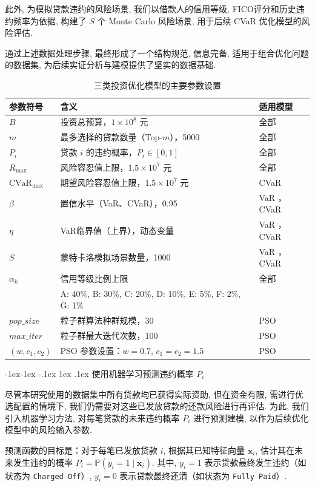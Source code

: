 \documentclass{write_paper}
\makeatletter
\renewcommand\subsection{\@startsection{subsection}{2}{\z@}%
                                     {-1ex\@plus -1ex \@minus -.1ex}%
                                     {1ex \@plus .1ex}%
                                     {\normalfont \normalsize \bfseries}}
\makeatother
\begin{document}
此外, 为模拟贷款违约的风险场景, 我们以借款人的信用等级, FICO评分和历史违约频率为依据, 构建了 $S$ 个 Monte Carlo 风险场景, 用于后续 CVaR 优化模型的风险评估. 

通过上述数据处理步骤, 最终形成了一个结构规范, 信息完备, 适用于组合优化问题的数据集, 为后续实证分析与建模提供了坚实的数据基础. 

\begin{table}[htbp]
\centering
\caption{三类投资优化模型的主要参数设置}
\begin{tabular}{lll}
\toprule
 {参数符号} &{含义} &{适用模型} \\
\midrule
$B$ & 投资总预算，$1 \times 10^8$ 元 & 全部 \\
$m$ & 最多选择的贷款数量（Top-$m$），5000 & 全部 \\
$P_i$ & 贷款 $i$ 的违约概率，$P_i \in [0, 1]$ & 全部 \\
$R_{\max}$ & 风险容忍值上限，$1.5 \times 10^7$ 元 & 全部 \\
$\text{CVaR}_{\max}$ & 期望风险容忍值上限，$1.5 \times 10^7$ 元 & CVaR\\
$\beta$ & 置信水平（VaR、CVaR），0.95 & VaR ，CVaR\\
$\eta$ & VaR临界值（上界），动态变量 & VaR ，CVaR\\
$S$ & 蒙特卡洛模拟场景数量，1000 & VaR ，CVaR\\
$\alpha_k$ & 信用等级比例上限 & 全部\\
& \quad A: 40\%, B: 30\%, C: 20\%, D: 10\%, E: 5\%, F: 2\%, G: 1\% & \\
$pop\_size$ & 粒子群算法种群规模，30 & PSO  \\
$max\_iter$ & 粒子群最大迭代次数，100 & PSO  \\
$(w, c_1, c_2)$ & PSO 参数设置：$w=0.7$, $c_1=c_2=1.5$ & PSO  \\
\bottomrule
\end{tabular}
\label{tab:three-model-params}
\end{table}
\subsection{使用机器学习预测违约概率 $P_i$}
\label{subsec:predict_p_i}

尽管本研究使用的数据集中所有贷款均已获得实际资助, 但在资金有限, 需进行优选配置的情境下, 我们仍需要对这些已发放贷款的还款风险进行再评估. 为此, 我们引入机器学习方法, 对每笔贷款的未来违约概率 $P_i$ 进行预测建模, 以作为后续优化模型中的风险输入参数. 

 
预测函数的目标是：对于每笔已发放贷款 $i$, 根据其已知特征向量 $\mathbf{x}_i$, 估计其在未来发生违约的概率 $P_i = \mathbb{P}(y_i = 1 \mid \mathbf{x}_i)$. 其中, $y_i=1$ 表示贷款最终发生违约（如状态为 \texttt{Charged Off}）, $y_i=0$ 表示贷款最终还清（如状态为 \texttt{Fully Paid}）. 
\end{document}
